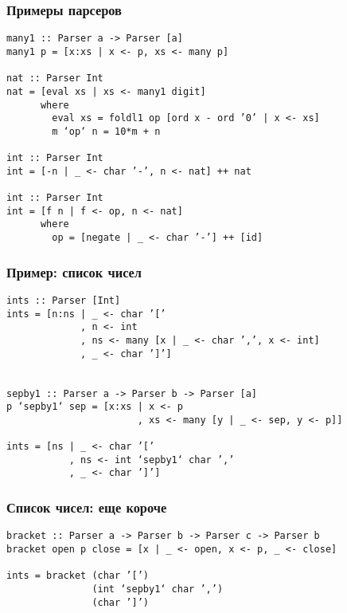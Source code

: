 \documentclass{beamer}
\begin{document}
\begin{frame}[fragile]
  \transwipe[direction=90]
  \frametitle{Примеры парсеров}
\begin{verbatim}
many1 :: Parser a -> Parser [a]
many1 p = [x:xs | x <- p, xs <- many p]

nat :: Parser Int
nat = [eval xs | xs <- many1 digit]
      where
        eval xs = foldl1 op [ord x - ord ’0’ | x <- xs]
        m ‘op‘ n = 10*m + n

int :: Parser Int
int = [-n | _ <- char ’-’, n <- nat] ++ nat

int :: Parser Int
int = [f n | f <- op, n <- nat]
      where
        op = [negate | _ <- char ’-’] ++ [id]
\end{verbatim}
\end{frame}


\begin{frame}[fragile]
  \transwipe[direction=90]
  \frametitle{Пример: список чисел}
\begin{verbatim}
ints :: Parser [Int]
ints = [n:ns | _ <- char ’[’
             , n <- int
             , ns <- many [x | _ <- char ’,’, x <- int]
             , _ <- char ’]’]


sepby1 :: Parser a -> Parser b -> Parser [a]
p ‘sepby1‘ sep = [x:xs | x <- p
                       , xs <- many [y | _ <- sep, y <- p]]

ints = [ns | _ <- char ’[’
           , ns <- int ‘sepby1‘ char ’,’
           , _ <- char ’]’]

\end{verbatim}
\end{frame}


\begin{frame}[fragile]
  \transwipe[direction=90]
  \frametitle{Список чисел: еще короче}
\begin{verbatim}
bracket :: Parser a -> Parser b -> Parser c -> Parser b
bracket open p close = [x | _ <- open, x <- p, _ <- close]

ints = bracket (char ’[’)
               (int ‘sepby1‘ char ’,’)
               (char ’]’)
\end{verbatim}
\end{frame}
\end{document}
